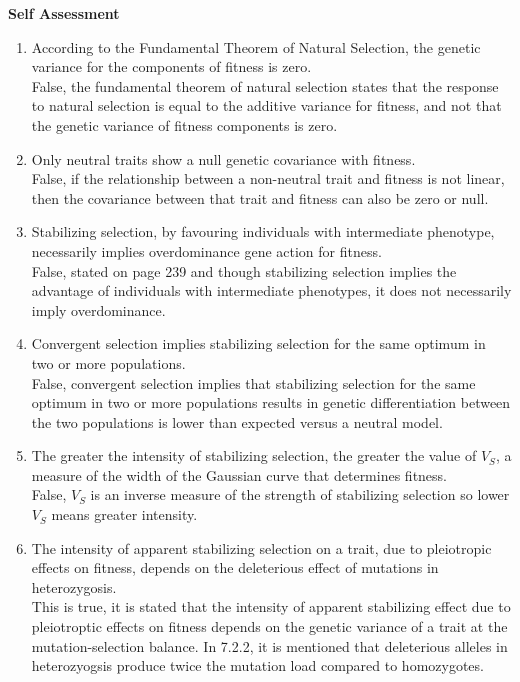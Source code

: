\documentclass[12pt]{amsart}
\begin{document}
{\large \bf Self Assessment}
\begin{enumerate}
\item According to the Fundamental Theorem of Natural Selection, the genetic variance for the components of fitness is zero.\\
False, the fundamental theorem of natural selection states that the response to natural selection is equal to the additive variance for fitness, and not that the genetic variance of fitness components is zero.\\
\item Only neutral traits show a null genetic covariance with fitness.\\
False, if the relationship between a non-neutral trait and fitness is not linear, then the covariance between that trait and fitness can also be zero or null.\\
\item Stabilizing selection, by favouring individuals with intermediate phenotype, necessarily implies overdominance gene action for fitness.\\
False, stated on page 239 and though stabilizing selection implies the advantage of individuals with intermediate phenotypes, it does not necessarily imply overdominance. \\
\item Convergent selection implies stabilizing selection for the same optimum in two or more populations.\\
False, convergent selection implies that stabilizing selection for the same optimum in two or more populations results in genetic differentiation between the two populations is lower than expected versus a neutral model.\\
\item The greater the intensity of stabilizing selection, the greater the value of $V_S$, a measure of the width of the Gaussian curve that determines fitness.\\
False, $V_S$ is an inverse measure of the strength of stabilizing selection so lower $V_S$ means greater intensity.\\
\item The intensity of apparent stabilizing selection on a trait, due to pleiotropic effects on fitness, depends on the deleterious effect of mutations in heterozygosis.\\
This is true, it is stated that the intensity of apparent stabilizing effect due to pleiotroptic effects on fitness depends on the genetic variance of a trait at the mutation-selection balance. In 7.2.2, it is mentioned that deleterious alleles in heterozyogsis produce twice the mutation load compared to homozygotes.\\

\end{enumerate}
\end{document}
